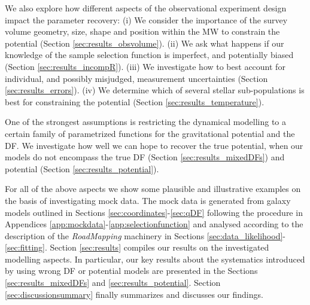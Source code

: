 \documentclass[iop,revtex4,numberedappendix,appendixfloats]{emulateapj}
\newcommand{\RM}{{\sl RoadMapping}}
\begin{document}
We also explore how different aspects of the observational experiment design impact the parameter recovery: (i) We consider the importance of the survey volume geometry, size, shape and position within the MW to constrain the potential (Section \ref{sec:results_obsvolume}). (ii) We ask what happens if our knowledge of the sample selection function is imperfect, and potentially biased (Section \ref{sec:results_incompR}). (iii) We investigate how to best account for individual, and possibly misjudged, measurement uncertainties (Section \ref{sec:results_errors}). (iv) We determine which of several stellar sub-populations is best for constraining the potential (Section \ref{sec:results_temperature}). 

One of the strongest assumptions is restricting the dynamical modelling to a certain family of parametrized functions for the gravitational potential and the DF. We investigate how well we can hope to recover the true potential, when our models do not encompass the true DF (Section \ref{sec:results_mixedDFs}) and potential (Section \ref{sec:results_potential}).

For all of the above aspects we show some plausible and illustrative examples on the basis of investigating mock data. The mock data is generated from galaxy models outlined in Sections \ref{sec:coordinates}-\ref{sec:qDF} following the procedure in Appendices \ref{app:mockdata}-\ref{app:selectionfunction} and analysed according to the description of the \RM{} machinery in Sections \ref{sec:data_likelihood}-\ref{sec:fitting}. Section \ref{sec:results} compiles our results on the investigated modelling aspects. In particular, our key results about the systematics introduced by using wrong DF or potential models are presented in the Sections \ref{sec:results_mixedDFs} and \ref{sec:results_potential}. Section \ref{sec:discussionsummary} finally summarizes and discusses our findings.


\end{document}
